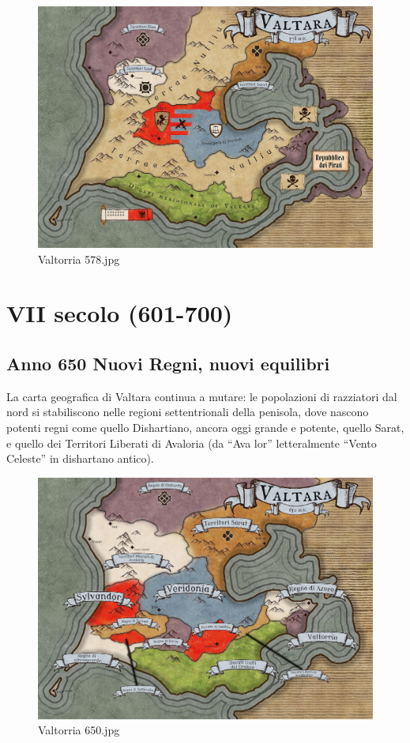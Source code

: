 \begin{figure}
\centering
\includegraphics{Valtorria_578.jpg}
\caption{Valtorria 578.jpg}
\end{figure}

\section{VII secolo (601-700)}\label{vii-secolo-601-700}

\subsection{Anno 650 Nuovi Regni, nuovi
equilibri}\label{anno-650-nuovi-regni-nuovi-equilibri}

La carta geografica di Valtara continua a mutare: le popolazioni di
razziatori dal nord si stabiliscono nelle regioni settentrionali della
penisola, dove nascono potenti regni come quello Dishartiano, ancora
oggi grande e potente, quello Sarat, e quello dei Territori Liberati di
Avaloria (da ``Ava lor'' letteralmente ``Vento Celeste'' in dishartano
antico).

\begin{figure}
\centering
\includegraphics{Valtorria_650.jpg}
\caption{Valtorria 650.jpg}
\end{figure}

